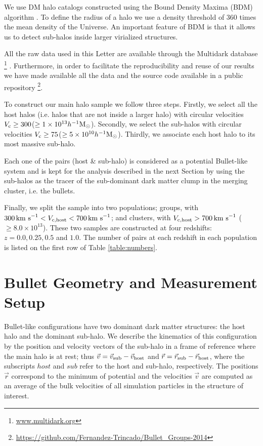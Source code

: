 \documentclass{emulateapj}
\newcommand{\hMsun}{{\ifmmode{h^{-1}{\rm {M_{\odot}}}}\else{$h^{-1}{\rm{M_{\odot}}}$}\fi}}
\newcommand{\kms}{{\ifmmode{{\mathrm{\,km\ s}^{-1}}}\else{\,km~s$^{-1}$}\fi}}
\begin{document}
We use DM halo catalogs constructed using the Bound Density Maxima (BDM)
algorithm \citep{BDM,BDMb}. To define the radius of a halo we use a
density threshold of 360 times the mean density of the Universe. An
important feature of BDM is that it allows us to detect sub-halos
inside larger virialized structures.     

All the raw data used in this Letter are available through the
Multidark database \footnote{\url{www.multidark.org}}
\citep{Riebe2013}.  Furthermore, in order to facilitate the
reproducibility and reuse of our results we have made available all
the data and the source code available in a public
repository \footnote{\url{https://github.com/Fernandez-Trincado/Bullet\_Groups-2014}}.  
 
To construct our main halo sample we follow three steps. Firstly, we
select all the host halos (i.e. halos that are not inside a larger
halo) with circular velocities $V_{\rm c}\geq 300$\kms ($\geq 1\times
10^{13} \hMsun$). Secondly, we select the sub-halos with circular
velocities $V_{\rm c}\geq 75$\kms ($\geq 5\times
10^{10}\hMsun$). Thirdly, we associate each host halo to its most
massive sub-halo.  

Each one of the pairs (host \& sub-halo) is considered as a
potential Bullet-like system and is kept for the analysis described in the
next Section  by using the sub-halos as the tracer of the sub-dominant
dark matter clump in the merging cluster, i.e. the bullets.  

Finally, we split the sample into two  populations; groups, with
$300\kms < V_{\rm c, host}<700\kms$; and clusters, with $V_{\rm
  c,host}>700\kms$ ($\geq 8.0\times 10^{13}$\hMsun). These two samples
are constructed at four redshifts: $z=0.0, 0.25, 0.5$ and $1.0$.  The
number of pairs at each redshift in each population is listed on the
first row of Table \ref{table:numbers}.  



\section{Bullet Geometry and Measurement Setup}
\label{sec:setup}

Bullet-like configurations have two dominant dark matter structures:
the host halo and the dominant sub-halo. We describe the kinematics of
this configuration by the  position and velocity vectors of the
sub-halo in a frame of reference where the main halo is at rest; thus
$\vec{v{}}=\vec{v}_{\rm sub}-\vec{v}_{\rm host}$ and
$\vec{r{}}=\vec{r}_{\rm sub}-\vec{r}_{\rm host}$, where the subscripts $host$
and $sub$ refer to the host and sub-halo, respectively. The positions
$\vec{r}$ correspond to the minimum of potential and the velocities
$\vec{v}$ are computed as an average of the bulk velocities of all
simulation particles in the structure of interest.
\end{document}
